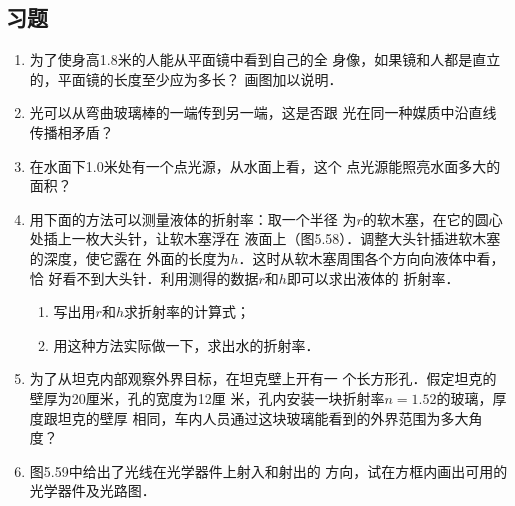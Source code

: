 \subsection{习题}
\begin{enumerate}
    \item 为了使身高1.8米的人能从平面镜中看到自己的全
身像，如果镜和人都是直立的，平面镜的长度至少应为多长？
画图加以说明．

\begin{solution}

\end{solution}
\item 光可以从弯曲玻璃棒的一端传到另一端，这是否跟
光在同一种媒质中沿直线传播相矛盾？

\begin{solution}

\end{solution}
\item 在水面下1.0米处有一个点光源，从水面上看，这个
点光源能照亮水面多大的面积？

\begin{solution}

\end{solution}
\item 用下面的方法可以测量液体的折射率：取一个半径
为$r$的软木塞，在它的圆心处插上一枚大头针，让软木塞浮在
液面上（图5.58）．调整大头针插进软木塞的深度，使它露在
外面的长度为$h$．这时从软木塞周围各个方向向液体中看，恰
好看不到大头针．利用测得的数据$r$和$h$即可以求出液体的
折射率．
\begin{enumerate}
    \item 写出用$r$和$h$求折射率的计算式；
    \item 用这种方法实际做一下，求出水的折射率．
\end{enumerate}
\begin{figure}[htp]\centering
    \caption{}
    \end{figure}
\item 为了从坦克内部观察外界目标，在坦克壁上开有一
个长方形孔．假定坦克的壁厚为20厘米，孔的宽度为12厘
米，孔内安装一块折射率$n=1.52$的玻璃，厚度跟坦克的壁厚
相同，车内人员通过这块玻璃能看到的外界范围为多大角度？

\begin{solution}

\end{solution}
\item 图5.59中给出了光线在光学器件上射入和射出的
方向，试在方框内画出可用的光学器件及光路图．
\begin{figure}[htp]
	\centering
\begin{tikzpicture}[>=latex]
  

\end{tikzpicture}
\end{figure}
\end{enumerate}
